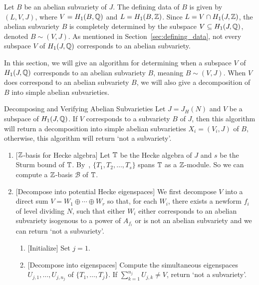 Let $B$ be an abelian subvariety of $J$. The defining data of $B$ is given by
$(L, V, J)$, where $V=H_1(B,\mathbb{Q})$ and $L = H_1(B, \mathbb{Z})$. Since $L = V\cap
H_1(J, \mathbb{Z})$, the abelian subvariety $B$ is completely determined by the
subspace $V\subseteq H_1(J, \mathbb{Q})$, denoted $B\sim (V, J)$. As mentioned in
Section~\ref{sec:defining_data}, not every subspace $V$ of $H_1(J, \mathbb{Q})$
corresponds to an abelian subvariety.

In this section, we will give an algorithm for determining when a subspace $V$
of $H_1(J, \mathbb{Q})$ corresponds to an abelian subvariety $B$, meaning $B\sim (V,
J)$. When $V$ does correspond to an abelian subvariety $B$, we will also give
a decomposition of $B$ into simple abelian subvarieties.

\begin{algorithm}{Decomposing and Verifying Abelian Subvarieties}
    \label{alg:decomp_and_verify_subvarieties}
    Let $J=J_H(N)$ and $V$ be a subspace of $H_1(J, \mathbb{Q})$. If $V$ corresponds
    to a subvariety $B$ of $J$, then this algorithm will return a decomposition
    into simple abelian subvarieties $X_i=(V_i, J)$ of $B$, otherwise, this
    algorithm will return `not a subvariety'.
    \begin{enumerate}
        \item{} [$\mathbb{Z}$-basis for Hecke algebra]
            Let $\mathbb{T}$ be the Hecke algebra of $J$ and $s$ be the Sturm bound of
            $\mathbb{T}$. By~\cite[Appendix]{lario-schoof}, $\{T_1,T_2,\ldots, T_s\}$
            spans $\mathbb{T}$ as a $\mathbb{Z}$-module. So we can compute a $\mathbb{Z}$-basis
            $\mathcal{B}$ of $\mathbb{T}$.
        \item{} [Decompose into potential Hecke eigenspaces]
            We first decompose $V$ into a direct sum $V=W_1\oplus \cdots \oplus
            W_r$ so that, for each $W_i$, there exists a newform $f_i$ of level
            dividing $N$, such that either $W_i$ either corresponds to an
            abelian subvariety isogenous to a power of $A_{f_i}$ or is not an
            abelian subvariety and we can return `not a subvariety'.
            \begin{enumerate}
                \item{} [Initialize]
                    Set $j=1$.
                \item{} [Decompose into eigenspaces]
                    Compute the simultaneous eigenspaces $U_{j,1},\ldots,U_{j,
                    n_j}$ of $\{T_1,\ldots,T_j\}$. If $\sum_{k=1} ^{n_j}
                    U_{j, k}\neq V$, return `not a subvariety'.

\end{enumerate}
\end{enumerate}
\end{algorithm}
